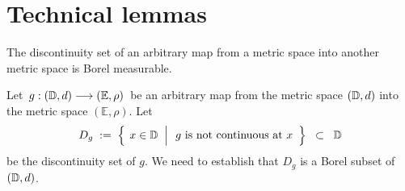 

\section{Technical lemmas}
\setcounter{theorem}{0}
\setcounter{equation}{0}


\renewcommand{\theenumi}{\roman{enumi}}
\renewcommand{\labelenumi}{\textnormal{(\theenumi)}$\;\;$}


\begin{proposition}\label{DiscontinuitySetsInMetricSpacesAreBorel}
\mbox{} \vskip 0.1cm \noindent
The discontinuity set of an arbitrary map from a metric space into another metric space is Borel measurable.
\end{proposition}
\proof
Let \,$g : (\mathbb{D},d) \longrightarrow (\mathbb{E},\rho)$\, be an arbitrary map from
the metric space $(\mathbb{D},d)$ into the metric space $(\mathbb{E},\rho)$.
Let
\begin{equation*}
D_{g}
\; := \;
	\left\{\;\left.
		x\overset{{\color{white}.}}{\in}\D
		\;\;\right\vert
		\begin{array}{c}\textnormal{$g$ is not continuous at $x$}\end{array}
		\right\}
\;\;\subset\;\; \D
\end{equation*}
be the discontinuity set of $g$.
We need to establish that $D_{g}$ is a Borel subset of $(\mathbb{D},d)$.

